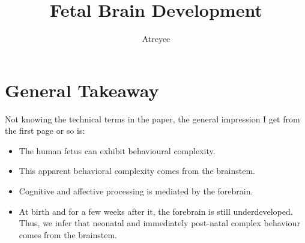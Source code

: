 \documentclass[letterpaper,12pt]{article}
\title{Fetal Brain Development}
\author{Atreyee}
\begin{document}
\maketitle

\section{General Takeaway}

Not knowing the technical terms in the paper, the general impression I get from the first page or so is:

\begin{itemize}
\item
The human fetus can exhibit behavioural complexity.
\item
This apparent behavioral complexity comes from the brainstem.
\item
Cognitive and affective processing is mediated by the forebrain.
\item
At birth and for a few weeks after it, the forebrain is still underdeveloped. Thus, we infer that neonatal and immediately post-natal complex behaviour comes from the brainstem.
\end{itemize}
\end{document}
